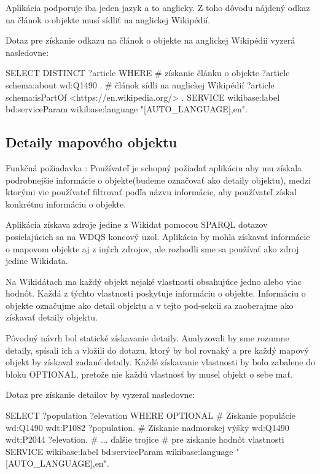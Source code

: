 Aplikácia podporuje iba jeden jazyk a to anglicky. Z toho dôvodu nájdený odkaz na článok o objekte musí sídliť na
anglickej Wikipédií.

Dotaz pre získanie odkazu na článok o objekte na anglickej Wikipédii vyzerá nasledovne:
\begin{code}
      SELECT DISTINCT ?article
      WHERE {
      # získanie článku o objekte
      ?article schema:about wd:Q1490 .
      # článok sídli na anglickej Wikipédií
      ?article schema:isPartOf <https://en.wikipedia.org/> .
      SERVICE wikibase:label {
      bd:serviceParam wikibase:language "[AUTO_LANGUAGE],en".
      }
      }
\end{code}

\subsection{Detaily mapového objektu}
Funkčná požiadavka : Používateľ je schopný požiadať aplikáciu aby mu získala podrobnejšie informácie o objekte(budeme označovať ako detaily objektu), medzi ktorými vie používateľ
filtrovať podľa názvu informácie, aby používateľ získal konkrétnu informáciu o objekte.

Aplikácia získava zdroje jedine z Wikidat pomocou SPARQL dotazov posielajúcich sa na WDQS koncový uzol.
Aplikácia by mohla získavať informácie o mapovom objekte aj z iných zdrojov, ale rozhodli sme sa používať ako zdroj jedine Wikidata.

Na Wikidátach ma každý objekt nejaké vlastnosti obsahujúce jedno alebo viac hodnôt. Každá z týchto vlastnosti poskytuje informáciu o objekte.
Informáciu o objekte označujme ako detail objektu a v tejto pod-sekcii sa zaoberajme ako získavať detaily objektu.

Pôvodný návrh bol statické získavanie detaily. Analyzovali by sme rozumne detaily, spísali ich a vložili do dotazu, ktorý
by bol rovnaký a pre každý mapový objekt by získaval zadané detaily. Každé získavanie vlastnosti by bolo
zabalene do bloku OPTIONAL, pretože nie každú vlastnosť by musel objekt o sebe mať.

Dotaz pre získanie detailov by vyzeral nasledovne:
\begin{code}
      SELECT ?population ?elevation
      WHERE
      {
      OPTIONAL{
                  # Získanie populácie
                  wd:Q1490 wdt:P1082 ?population.
                  # Získanie nadmorskej výšky
                  wd:Q1490 wdt:P2044 ?elevation.
                  # ... ďalšie trojice
                  # pre získanie hodnôt vlastnosti
            }
      SERVICE wikibase:label {
      bd:serviceParam wikibase:language "[AUTO_LANGUAGE],en".
      }
      }
\end{code}

